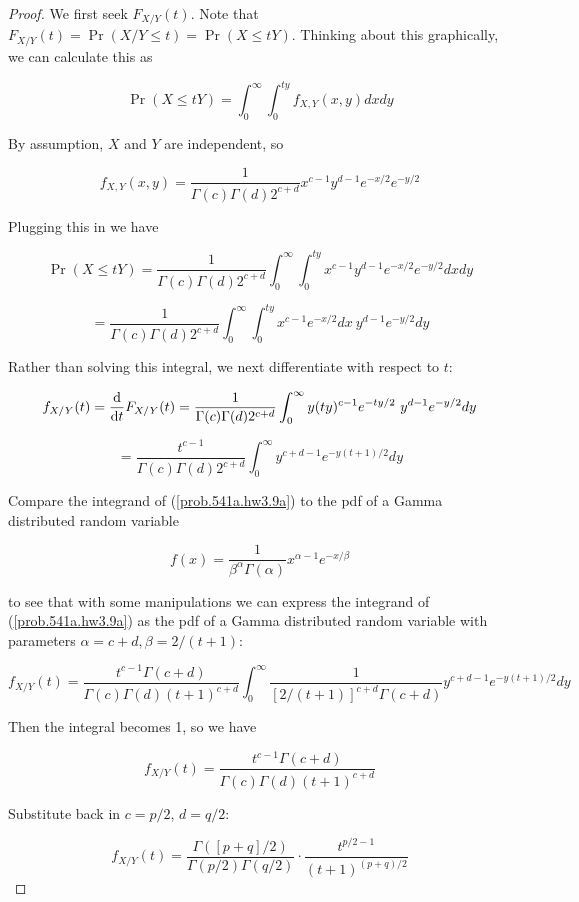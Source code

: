 \begin{itemize}
\begin{proof}
We first seek \(F_{X/Y}(t)\). Note that \( F_{X/Y}(t) = \Pr(X/Y \leq t) = \Pr(X \leq tY)\). Thinking about this graphically, we can calculate this as

\[
 \Pr(X \leq tY) = \int_0^\infty \int_0^{ty}  f_{X,Y}(x,y)    dx dy
\]

By assumption, \(X\) and \(Y\) are independent, so

\[
f_{X,Y}(x,y) = \frac{1}{\Gamma(c)\Gamma(d)2^{c+d}}x^{c-1}y^{d-1}e^{-x/2}e^{-y/2}
\]

Plugging this in we have

\[
 \Pr(X \leq tY) =   \frac{1}{\Gamma(c)\Gamma(d)2^{c+d}} \int_0^\infty \int_0^{ty}x^{c-1}y^{d-1}e^{-x/2}e^{-y/2}   dx dy
\]

\[
=   \frac{1}{\Gamma(c)\Gamma(d)2^{c+d}} \int_0^\infty \int_0^{ty}x^{c-1}e^{-x/2}  dx  \ y^{d-1} e^{-y/2}  dy
\]

Rather than solving this integral, we next differentiate with respect to \(t\):

\[
f_{X/Y}(t) = \frac{\mathrm{d} }{\mathrm{d} t} F_{X/Y}(t) =    \frac{1}{\Gamma(c)\Gamma(d)2^{c+d}} \int_0^\infty y (ty)^{c-1}e^{-ty/2}    \ y^{d-1} e^{-y/2} dy 
\]

\begin{equation}\label{prob.541a.hw3.9a}
=    \frac{t^{c-1}}{\Gamma(c)\Gamma(d)2^{c+d}} \int_0^\infty  y^{c+d-1} e^{-y(t+1)/2} dy 
\end{equation}

Compare the integrand of (\ref{prob.541a.hw3.9a}) to the pdf of a Gamma distributed random variable

\[
f(x)  = \frac{1}{\beta^\alpha\Gamma(\alpha)} x^{\alpha - 1} e^{-x/\beta}
\]

to see that with some manipulations we can express the integrand of (\ref{prob.541a.hw3.9a}) as the pdf of a Gamma distributed random variable with parameters \(\alpha = c+d, \beta = 2/(t+1)\):

\[
f_{X/Y}(t)    =  \frac{t^{c-1}\Gamma(c+d)     }{ \Gamma(c) \Gamma(d)(t+1)^{c+d}     } \int_0^\infty \frac{1}{[2/(t+1)]^{c+d}\Gamma(c+d)} y^{c+d - 1} e^{-y(t+1)/2} dy
\]

Then the integral becomes 1, so we have

\[
f_{X/Y}(t)  =  \frac{t^{c-1}\Gamma(c+d)     }{ \Gamma(c) \Gamma(d)(t+1)^{c+d}     }
\]

Substitute back in \(c = p/2\), \(d = q/2\):

\[
f_{X/Y}(t)  =  \frac{\Gamma([p+q]/2)  }{\Gamma(p/2)\Gamma(q/2) } \cdot  \frac{t^{p/2-1}   }{  (t+1)^{(p+q)/2} }
\]


\end{proof}
\end{itemize}
